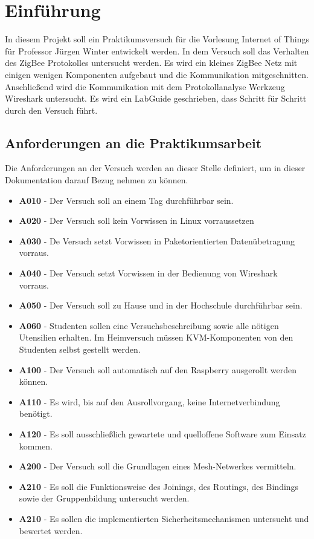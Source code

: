 \chapter{Einführung}

In diesem Projekt soll ein Praktikumsversuch für die Vorlesung Internet of Things für Professor Jürgen Winter 
entwickelt werden. In dem Versuch soll das Verhalten des ZigBee Protokolles untersucht werden. Es wird ein kleines
ZigBee Netz mit einigen wenigen Komponenten aufgebaut und die Kommunikation mitgeschnitten. Anschließend wird die
Kommunikation mit dem Protokollanalyse Werkzeug Wireshark untersucht. Es wird ein \grqq LabGuide \grqq{} geschrieben,
dass Schritt für Schritt durch den Versuch führt.

\section{Anforderungen an die Praktikumsarbeit}

Die Anforderungen an der Versuch werden an dieser Stelle definiert, um in dieser Dokumentation 
darauf Bezug nehmen zu können.
\begin{itemize}
    \item \textbf{A010} - Der Versuch soll an einem Tag durchführbar sein.
    \item \textbf{A020} - Der Versuch soll kein Vorwissen in Linux vorraussetzen
    \item \textbf{A030} - De Versuch setzt Vorwissen in Paketorientierten Datenübetragung vorraus.
    \item \textbf{A040} - Der Versuch setzt Vorwissen in der Bedienung von Wireshark vorraus.
    \item \textbf{A050} - Der Versuch soll zu Hause und in der Hochschule durchführbar sein.
    \item \textbf{A060} - Studenten sollen eine Versuchsbeschreibung sowie alle nötigen Utensilien erhalten. Im Heimversuch müssen KVM-Komponenten von den Studenten selbst gestellt werden.
    \item \textbf{A100} - Der Versuch soll automatisch auf den Raspberry ausgerollt werden können.
    \item \textbf{A110} - Es wird, bis auf den Ausrollvorgang, keine Internetverbindung benötigt.
    \item \textbf{A120} - Es soll ausschließlich gewartete und quelloffene Software zum Einsatz kommen.
    \item \textbf{A200} - Der Versuch soll die Grundlagen eines Mesh-Netwerkes vermitteln.
    \item \textbf{A210} - Es soll die Funktionsweise des Joinings, des Routings, des Bindings sowie der Gruppenbildung untersucht werden.
    \item \textbf{A210} - Es sollen die implementierten Sicherheitsmechanismen untersucht und bewertet werden.
\end{itemize}

